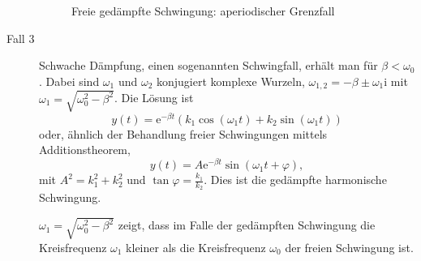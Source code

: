 \documentclass[%
11pt,%
twoside,%
titlepage,%
swissgerman,%
headsepline%
]{scrartcl}
\newcommand{\definition}[1]{\colorbox{emerald}{#1}}
\theoremstyle{definition}
\theoremstyle{plain}
\begin{document}
\begin{description}
\begin{figure}
\begin{center}
\end{center}
\caption{Freie gedämpfte Schwingung: aperiodischer Grenzfall}
\end{figure}

\item[Fall 3] Schwache Dämpfung, einen sogenannten \definition{Schwingfall}, erhält man für $\beta<\omega_0$.
Dabei sind $\omega_1$ und $\omega_2$ konjugiert komplexe Wurzeln, $\omega_{1,2}=-\beta\pm\omega_1\mathrm{i}$ mit $\omega_1=\sqrt{\omega_0^2-\beta^2}$. Die Lösung ist
$$y(t)=\mathrm{e}^{-\beta t}(k_1\cos(\omega_1 t)+k_2\sin(\omega_1 t))$$
oder, ähnlich der Behandlung freier Schwingungen mittels Additionstheorem,
$$y(t)=A\mathrm{e}^{-\beta t}\sin(\omega_1 t+\varphi),$$
mit $A^2=k_1^2+k_2^2$ und $\tan\varphi=\frac{k_1}{k_2}$. Dies ist die gedämpfte harmonische Schwingung.

$\omega_1=\sqrt{\omega_0^2-\beta^2}$ zeigt, dass im Falle der gedämpften Schwingung die Kreisfrequenz $\omega_1$ kleiner als die Kreisfrequenz $\omega_0$ der freien Schwingung ist.

\begin{figure}
\begin{center}


\end{center}
\end{figure}
\end{description}
\end{document}
